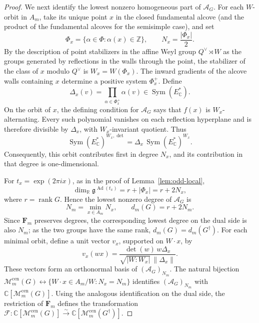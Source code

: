 \documentclass[11pt,a4paper,reqno]{amsart}
\theoremstyle{plain}
\theoremstyle{definition}
\theoremstyle{remark}
\numberwithin{equation}{section}
\DeclareMathOperator{\Sym}{Sym}
\DeclareMathOperator{\Ad}{Ad}
\newcommand{\CC}{\mathbb C}
\newcommand{\ZZ}{\mathbb Z}
\newcommand{\RR}{\mathbb R}
\newcommand{\fg}{\mathfrak g}
\newcommand{\cM}{\mathcal M}
\newcommand{\eexp}[1]{\exp(2\pi i #1)}
\begin{document}
\begin{proof}
We next identify the lowest nonzero homogeneous part of $\mathscr A_G$. For each $W$-orbit in $A_m$, take its unique point $x$ in the closed fundamental alcove (and the product of the fundamental alcoves for the semisimple case), and set
\[
\Phi_x=\{\alpha\in\Phi:\alpha(x)\in\ZZ\},\qquad N_x=\frac{|\Phi_x|}{2}.
\]
By the description of point stabilizers in the affine Weyl group $Q^\vee\rtimes W$ as the groups generated by reflections in the walls through the point, the stabilizer of the class of $x$ modulo $Q^\vee$ is $W_x=W(\Phi_x)$. The inward gradients of the alcove walls containing $x$ determine a positive system $\Phi_x^+$. Define
\[
\Delta_x(v)=\prod_{\alpha\in\Phi_x^+}\alpha(v)\in \Sym(E_{\CC}^*).
\]
On the orbit of $x$, the defining condition for $\mathscr A_G$ says that $f(x)$ is $W_x$-alternating. Every such polynomial vanishes on each reflection hyperplane and is therefore divisible by $\Delta_x$, with $W_x$-invariant quotient. Thus
\[
\Sym(E_{\CC}^*)^{W_x,\det}=\Delta_x\,\Sym(E_{\CC}^*)^{W_x}.
\]
Consequently, this orbit contributes first in degree $N_x$, and its contribution in that degree is one-dimensional.

For $t_x=\eexp{x}$, as in the proof of Lemma~\ref{lem:odd-local},
\[
\dim_{\RR}\fg^{\Ad(t_x)}=r+|\Phi_x|=r+2N_x,
\]
where $r=\operatorname{rank}G$. Hence the lowest nonzero degree of $\mathscr A_G$ is
\[
N_m=\min_{x\in A_m}N_x,\qquad d_m(G)=r+2N_m.
\]
Since $\mathbf F_m$ preserves degrees, the corresponding lowest degree on the dual side is also $N_m$; as the two groups have the same rank, $d_m(G)=d_m(G^\dagger)$. For each minimal orbit, define a unit vector $v_x$, supported on $W\cdot x$, by
\[
v_x(wx)=\frac{\det(w)\,w\Delta_x}{\sqrt{|W:W_x|}\,\|\Delta_x\|}.
\]
These vectors form an orthonormal basis of $(\mathscr A_G)_{N_m}$. The natural bijection $\cM_m^{\mathrm{cen}}(G)\leftrightarrow \{W\cdot x\in A_m/W:N_x=N_m\}$ identifies $(\mathscr A_G)_{N_m}$ with $\CC[\cM_m^{\mathrm{cen}}(G)]$. Using the analogous identification on the dual side, the restriction of $\mathbf F_m$ defines the transformation $\mathcal F\colon\CC[\cM_m^{\mathrm{cen}}(G)]\xrightarrow{\sim}\CC[\cM_m^{\mathrm{cen}}(G^\dagger)]$.


\end{proof}
\end{document}
